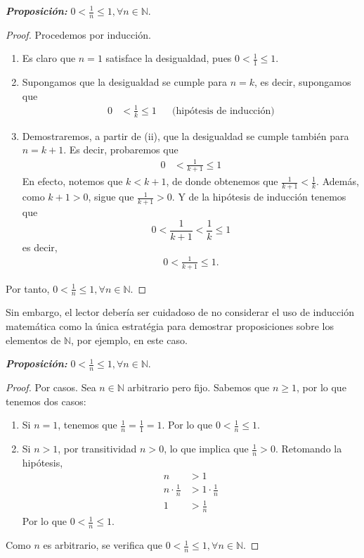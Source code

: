 \documentclass[11pt]{article}
\newcommand{\N}{\mathbb{N}}
\newcommand{\bfit}[1]{\textbf{\textit{#1}}}
\begin{document}
\bfit{Proposición:} $0<\frac{1}{n}\leq 1, \forall n\in \N$.
\begin{proof}
  Procedemos por inducción. \begin{enumerate}[label=\roman*)]
    \item Es claro que $n=1$ satisface la desigualdad, pues $0<\frac{1}{1} \leq 1$.
    \item Supongamos que la desigualdad se cumple para $n=k$, es decir, supongamos que \begin{align*}
      0&<\frac{1}{k}\leq 1 && \text{(hipótesis de inducción)}
    \end{align*}
    \item Demostraremos, a partir de (ii), que la desigualdad se cumple también para $n=k+1$. Es decir, probaremos que \begin{align*}
      0&<\frac{1}{k+1}\leq 1
    \end{align*}
    En efecto, notemos que $k<k+1$, de donde obtenemos que $\frac{1}{k+1} < \frac{1}{k}$. Además, como $k+1>0$, sigue que $\frac{1}{k+1}>0$. Y de la hipótesis de inducción tenemos que \[0 < \frac{1}{k+1} < \frac{1}{k} \leq 1\]
    es decir, \begin{align*}
      0<\frac{1}{k+1}\leq 1.
    \end{align*}
  \end{enumerate}
  Por tanto, $0<\frac{1}{n}\leq 1, \forall n\in \N$.
\end{proof}

Sin embargo, el lector debería ser cuidadoso de no considerar el uso de inducción matemática como la única estratégia para demostrar proposiciones sobre los elementos de $\N$, por ejemplo, en este caso.

\bfit{Proposición:} $0<\frac{1}{n}\leq 1, \forall n\in \N$.
 \begin{proof} Por casos.
  Sea $n\in \N$ arbitrario pero fijo. Sabemos que $n\geq 1$, por lo que tenemos dos casos: \begin{enumerate}[label=\roman*)]
   \item Si $n=1$, tenemos que $\frac{1}{n}=\frac{1}{1}=1$. Por lo que $0<\frac{1}{n}\leq 1$.
   \item Si $n>1$, por transitividad $n>0$, lo que implica que $\frac{1}{n}>0$. Retomando la hipótesis, \begin{align*}
    n &> 1\\
    n \cdot \frac{1}{n} &> 1\cdot \frac{1}{n}\\
    1 &> \frac{1}{n}
   \end{align*} Por lo que $0<\frac{1}{n}\leq 1$. 
  \end{enumerate} Como $n$ es arbitrario, se verifica que $0<\frac{1}{n}\leq 1, \forall n\in \N$.
 \end{proof}
\end{document}
